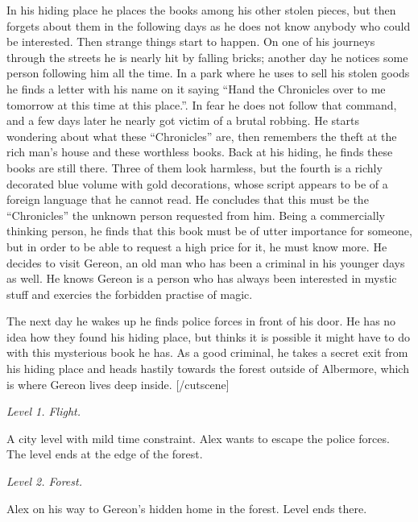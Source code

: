 \documentclass{gd-document}
\newcommand\level[1]{\textit{#1}}
\begin{document}
In his hiding place he places the books among his other stolen pieces,
but then forgets about them in the following days as he does not know
anybody who could be interested. Then strange things start to
happen. On one of his journeys through the streets he is nearly hit by
falling bricks; another day he notices some person following him all
the time. In a park where he uses to sell his stolen goods he finds a
letter with his name on it saying “Hand the Chronicles over to me
tomorrow at this time at this place.”. In fear he does not follow that
command, and a few days later he nearly got victim of a brutal
robbing. He starts wondering about what these “Chronicles” are, then
remembers the theft at the rich man’s house and these worthless
books. Back at his hiding, he finds these books are still there. Three
of them look harmless, but the fourth is a richly decorated blue
volume with gold decorations, whose script appears to be of a foreign
language that he cannot read. He concludes that this must be the
“Chronicles” the unknown person requested from him. Being a
commercially thinking person, he finds that this book must be of utter
importance for someone, but in order to be able to request a high
price for it, he must know more. He decides to visit Gereon, an old
man who has been a criminal in his younger days as well. He knows
Gereon is a person who has always been interested in mystic stuff and
exercies the forbidden practise of magic.

The next day he wakes up he finds police forces in front of his
door. He has no idea how they found his hiding place, but thinks it is
possible it might have to do with this mysterious book he has. As a
good criminal, he takes a secret exit from his hiding place and heads
hastily towards the forest outside of Albermore, which is where Gereon
lives deep inside.
[/cutscene]


\level{Level 1. Flight.}

A city level with mild time constraint. Alex wants to escape the
police forces. The level ends at the edge of the forest.

\level{Level 2. Forest.}

Alex on his way to Gereon’s hidden home in the forest. Level ends
there.
\end{document}

